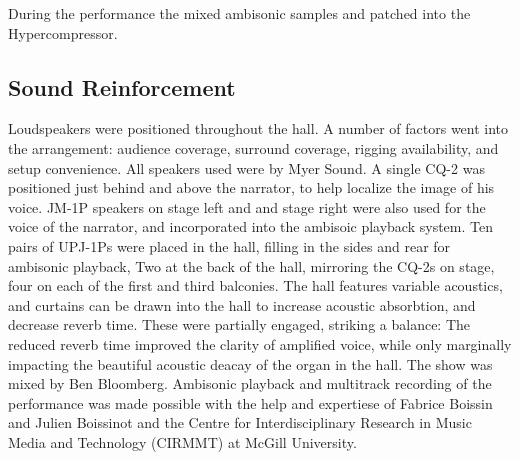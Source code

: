 During the performance the mixed ambisonic samples and patched into
the Hypercompressor. 




\subsection{Sound Reinforcement}
\label{sec:sound-reinforcement}
Loudspeakers were positioned throughout the hall. A number of factors
went into the arrangement: audience coverage, surround coverage,
rigging availability, and setup convenience. All speakers used were by
Myer Sound. A single CQ-2
was positioned just behind and above the narrator, to help localize
the image of his voice.  JM-1P speakers on stage left and and stage
right were also used for the voice of the narrator, and incorporated
into the ambisoic playback system. Ten pairs of UPJ-1Ps were placed in
the hall, filling in the sides and rear for ambisonic playback, Two at
the back of the hall, mirroring the CQ-2s on stage, four on each of
the first and third balconies.  The hall features variable acoustics,
and curtains can be drawn into the hall to increase acoustic
absorbtion, and decrease reverb time. These were partially engaged,
striking a balance: The reduced reverb time improved the clarity of
amplified voice, while only marginally impacting the beautiful
acoustic deacay of the organ in the hall. The show was mixed by Ben
Bloomberg. Ambisonic playback and multitrack recording of the
performance was made possible with the help and expertiese of Fabrice
Boissin and Julien Boissinot and the Centre for Interdisciplinary
Research in Music Media and Technology (CIRMMT) at McGill University.







